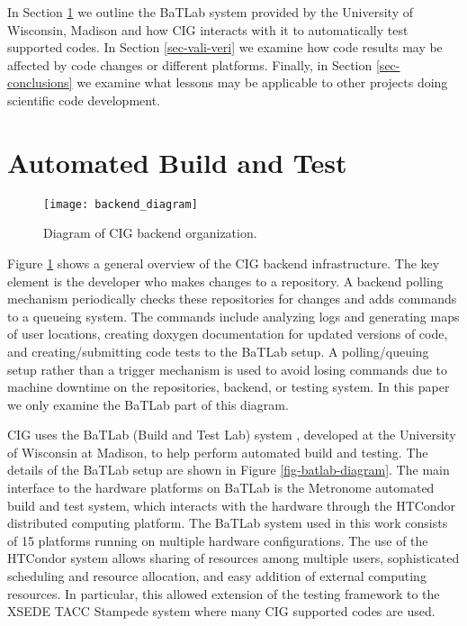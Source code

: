\documentclass{acm_proc_article-sp}
\begin{document}
In Section \ref{sec-build-test} we outline the BaTLab system provided by the University of Wisconsin, Madison and how CIG interacts with it to automatically test supported codes.  In Section \ref{sec-vali-veri} we examine how code results may be affected by code changes or different platforms. Finally, in Section \ref{sec-conclusions} we examine what lessons may be applicable to other projects doing scientific code development.

\section{Automated Build and Test}
\label{sec-build-test}

\begin{figure}
\centering
\texttt{[image: backend\_diagram]}
\caption{Diagram of CIG backend organization.}
\label{fig-cig-backend}
\end{figure}

Figure \ref{fig-cig-backend} shows a general overview of the CIG backend infrastructure.  The key element is the developer who makes changes to a repository.  A backend polling mechanism periodically checks these repositories for changes and adds commands to a queueing system.  The commands include analyzing logs and generating maps of user locations, creating doxygen documentation for updated versions of code, and creating/submitting code tests to the BaTLab setup.  A polling/queuing setup rather than a trigger mechanism is used to avoid losing commands due to machine downtime on the repositories, backend, or testing system.  In this paper we only examine the BaTLab part of this diagram.

CIG uses the BaTLab (Build and Test Lab) system \cite{Pavlo:2006:NBT:1267793.1267814}, developed at the University of Wisconsin at Madison, to help perform automated build and testing.  The details of the BaTLab setup are shown in Figure \ref{fig-batlab-diagram}.  The main interface to the hardware platforms on BaTLab is the Metronome automated build and test system, which interacts with the hardware through the HTCondor distributed computing platform.  The BaTLab system used in this work consists of 15 platforms running on multiple hardware configurations.  The use of the HTCondor system allows sharing of resources among multiple users, sophisticated scheduling and resource allocation, and easy addition of external computing resources.  In particular, this allowed extension of the testing framework to the XSEDE TACC Stampede system where many CIG supported codes are used.
\end{document}

